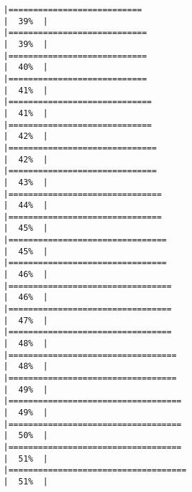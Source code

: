 \documentclass[
]{article}
\begin{document}
\begin{verbatim}
|===========================                                           |  39%  |                                                                              |============================                                          |  39%  |                                                                              |============================                                          |  40%  |                                                                              |============================                                          |  41%  |                                                                              |=============================                                         |  41%  |                                                                              |=============================                                         |  42%  |                                                                              |==============================                                        |  42%  |                                                                              |==============================                                        |  43%  |                                                                              |===============================                                       |  44%  |                                                                              |===============================                                       |  45%  |                                                                              |================================                                      |  45%  |                                                                              |================================                                      |  46%  |                                                                              |=================================                                     |  46%  |                                                                              |=================================                                     |  47%  |                                                                              |=================================                                     |  48%  |                                                                              |==================================                                    |  48%  |                                                                              |==================================                                    |  49%  |                                                                              |===================================                                   |  49%  |                                                                              |===================================                                   |  50%  |                                                                              |===================================                                   |  51%  |                                                                              |====================================                                  |  51%  |                                                                              
\end{verbatim}
\end{document}
